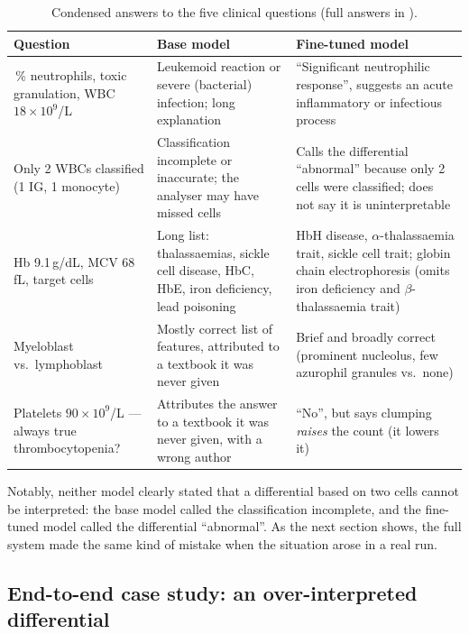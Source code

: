 \begin{table}[H]
\centering
\caption{Condensed answers to the five clinical questions (full answers in ).}
\label{tab:qual}
\footnotesize
\begin{tabularx}{\textwidth}{>{\raggedright\arraybackslash}p{3.3cm} X X}
\toprule
\textbf{Question} & \textbf{Base model} & \textbf{Fine-tuned model} \\
\midrule
78\,\% neutrophils, toxic granulation, WBC $18 \times 10^9$/L & Leukemoid reaction or severe (bacterial) infection; long explanation & ``Significant neutrophilic response'', suggests an acute inflammatory or infectious process \\
Only 2 WBCs classified (1 IG, 1 monocyte) & Classification incomplete or inaccurate; the analyser may have missed cells & Calls the differential ``abnormal'' because only 2 cells were classified; does not say it is uninterpretable \\
Hb 9.1\,g/dL, MCV 68\,fL, target cells & Long list: thalassaemias, sickle cell disease, HbC, HbE, iron deficiency, lead poisoning & HbH disease, $\alpha$-thalassaemia trait, sickle cell trait; globin chain electrophoresis (omits iron deficiency and $\beta$-thalassaemia trait) \\
Myeloblast vs.\ lymphoblast & Mostly correct list of features, attributed to a textbook it was never given & Brief and broadly correct (prominent nucleolus, few azurophil granules vs.\ none) \\
Platelets $90 \times 10^9$/L --- always true thrombocytopenia? & Attributes the answer to a textbook it was never given, with a wrong author & ``No'', but says clumping \emph{raises} the count (it lowers it) \\
\bottomrule
\end{tabularx}
\end{table}

Notably, neither model clearly stated that a differential based on two cells cannot be interpreted: the base model called the classification incomplete, and the fine-tuned model called the differential ``abnormal''. As the next section shows, the full system made the same kind of mistake when the situation arose in a real run.

\subsection{End-to-end case study: an over-interpreted differential}\label{sec:case}

